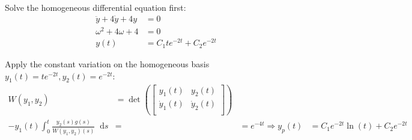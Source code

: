 \documentclass[utf8]{ctexart}
\newcommand{\dif}{\mathop{}\!\mathrm{d}}
\begin{document}
Solve the homogeneous differential equation first:
\begin{equation}
	\begin{aligned}
		\ddot{y}+4\dot{y}+4y   & =0                      \\
		\omega ^{2}+4\omega +4 & =0                      \\
		y(t)                   & =C_1te^{-2t}+C_2e^{-2t}
	\end{aligned}
\end{equation}

Apply the constant variation on the homogeneous basis \(y_1(t)=te^{-2t},y_2(t)=e^{-2t}\):
\begin{equation}
	\begin{aligned}
		W(y_1,y_2)           & =\det \left(\begin{bmatrix}
			                                   y_1(t)       & y_2(t)       \\
			                                   \dot{y}_1(t) & \dot{y}_2(t) \\
		                                   \end{bmatrix}\right) \\-y_1(t)\int_{0}^{t}\frac{y_2(s)g(s)}{W(y_1,y_2)(s)}\dif s & =
		                     & =e^{-4t}
		\Rightarrow y_{p}(t) & =C_1 e^{-2 t} \ln (t)+C_2 e^{-2 t}
	\end{aligned}
\end{equation}
\end{document}
